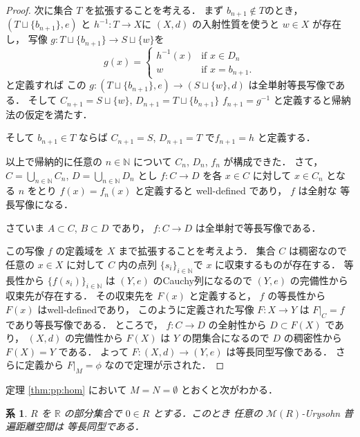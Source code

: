 \documentclass[leqno, 12pt]{jsarticle}
\newtheorem{cor}[thm]{系}
\newcommand{\nn}{\mathbb{N}}
\newcommand{\rr}{\mathbb{R}}
\begin{document}
\begin{proof}
次に集合
$T$
を拡張することを考える．
まず
$b_{n+1}\not\in T$のとき，
$(T\sqcup\{b_{n+1}\}, e)$
と
$h^{-1}\colon  T\to X$に
$(X, d)$
の入射性質を使うと
$w\in X$
が存在し，
写像
$g\colon  T\sqcup\{b_{n+1}\}\to S\sqcup\{w\}$を
\[
g(x)=
\begin{cases}
	h^{-1}(x) & \text{if $x\in D_{n}$}\\
	w & \text{if $x=b_{n+1}$}. 
\end{cases}
\]
と定義すれば
この
$g\colon  (T\sqcup \{b_{n+1}\}, e)\to (S\sqcup\{w\}, d)$
は全単射等長写像である．
そして
$C_{n+1}=S\sqcup \{w\}$, 
$D_{n+1}=T\sqcup \{b_{n+1}\}$
$f_{n+1}=g^{-1}$
と定義すると帰納法の仮定を満たす．


そして
$b_{n+1}\in T$
ならば
$C_{n+1}=S$,
 $D_{n+1}=T$
で$f_{n+1}=h$
と定義する．




以上で帰納的に任意の
$n\in \nn$
について
$C_{n}$, 
$D_{n}$, 
$f_{n}$
が構成できた．
さて，
$C=\bigcup_{n\in \nn}C_{n}$, 
$D=\bigcup_{n\in \nn}D_{n}$
とし
$f\colon  C\to  D$
を各
$x\in C$
に対して
$x\in C_{n}$
となる
$n$
をとり
$f(x)=f_{n}(x)$
と定義すると
well-defined
であり，
$f$
は全射な
等長写像になる．




さていま
$A\subset C$, 
$B\subset D$
であり，
$f\colon  C\to D$
は全単射で等長写像である．




この写像
$f$
の定義域を
$X$
まで拡張することを考えよう．
集合
$C$
は稠密なので任意の
$x\in X$
に対して
$C$
内の点列
$\{s_{i}\}_{i\in \nn}$で
$x$
に収束するものが存在する．
等長性から
$\{f(s_{i})\}_{i\in \nn}$
は
$(Y, e)$
のCauchy列になるので
$(Y, e)$
の完備性から収束先が存在する．
その収束先を
$F(x)$
と定義すると，
$f$
の等長性から
$F(x)$
はwell-definedであり，
このように定義された写像
$F\colon  X\to Y$
は
$F|_{C}=f$
であり等長写像である．
ところで，
$f\colon  C\to D$
の全射性から
$D\subset F(X)$
であり，
$(X, d)$
の完備性から
$F(X)$
は
$Y$
の閉集合になるので
$D$
の稠密性から
$F(X)=Y$
である．
よって
$F\colon (X, d)\to (Y, e)$
は等長同型写像である．
さらに定義から
$F|_{M}=\phi$
なので定理が示された．
\end{proof}




定理 \ref{thm:pp:hom}
において
$M=N=\emptyset$
とおくと次がわかる．
\begin{cor}\label{cor:pp:doukeiury}
$R$
を
$\rr$
の部分集合で
$0\in R$
とする．このとき
任意の
$\mathscr{M}(R)$-Urysohn
普遍距離空間は
等長同型である．
\end{cor}
\end{document}
